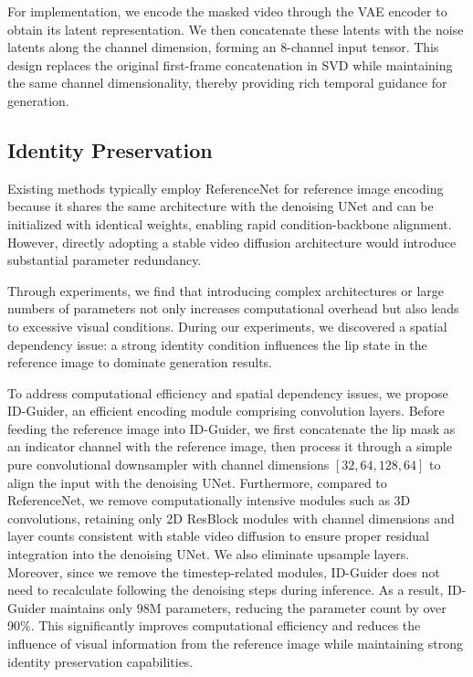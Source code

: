 For implementation, we encode the masked video through the VAE encoder to obtain its latent representation. We then concatenate these latents with the noise latents along the channel dimension, forming an 8-channel input tensor. This design replaces the original first-frame concatenation in SVD while maintaining the same channel dimensionality, thereby providing rich temporal guidance for generation.
\subsection{Identity Preservation}

Existing methods \citep{chang2023magicdance,jiang2024loopy} typically employ ReferenceNet \citep{hu2024animate} for reference image encoding because it shares the same architecture with the denoising UNet and can be initialized with identical weights, enabling rapid condition-backbone alignment. However, directly adopting a stable video diffusion architecture would introduce substantial parameter redundancy.

Through experiments, we find that introducing complex architectures or large numbers of parameters not only increases computational overhead but also leads to excessive visual conditions. During our experiments, we discovered a spatial dependency issue: a strong identity condition influences the lip state in the reference image to dominate generation results.

To address computational efficiency and spatial dependency issues, we propose ID-Guider, an efficient encoding module comprising convolution layers. Before feeding the reference image into ID-Guider, we first concatenate the lip mask as an indicator channel with the reference image, then process it through a simple pure convolutional downsampler with channel dimensions $[32, 64, 128, 64]$ to align the input with the denoising UNet. Furthermore, compared to ReferenceNet, we remove computationally intensive modules such as 3D convolutions, retaining only 2D ResBlock modules with channel dimensions and layer counts consistent with stable video diffusion to ensure proper residual integration into the denoising UNet. We also eliminate upsample layers. Moreover, since we remove the timestep-related modules, ID-Guider does not need to recalculate following the denoising steps during inference. As a result, ID-Guider maintains only 98M parameters, reducing the parameter count by over 90\%. This significantly improves computational efficiency and reduces the influence of visual information from the reference image while maintaining strong identity preservation capabilities.

